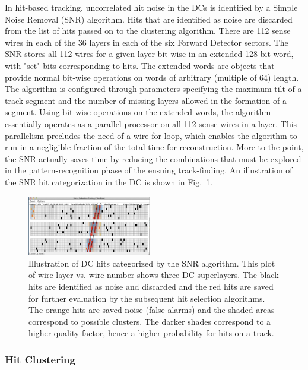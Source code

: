 In hit-based tracking, uncorrelated hit noise in the DCs is identified by a Simple Noise Removal (SNR) algorithm. Hits
that are identified as noise are discarded from the list of hits passed on to the clustering algorithm. There are 112
sense wires in each of the 36 layers in each of the six Forward Detector sectors. The SNR stores all 112 wires for a
given layer bit-wise in an extended 128-bit word, with "set" bits corresponding to hits. The extended words are
objects that provide normal bit-wise operations on words of arbitrary (multiple of 64) length. The algorithm is
configured through parameters specifying the maximum tilt of a track segment and the number of missing layers
allowed in the formation of a segment. Using bit-wise operations on the extended words, the algorithm essentially
operates as a parallel processor on all 112 sense wires in a layer. This parallelism precludes the need of a wire
for-loop, which enables the algorithm to run in a negligible fraction of the total time for reconstruction. More to the
point, the SNR actually saves time by reducing the combinations that must be explored in the pattern-recognition
phase of the ensuing track-finding. An illustration of the SNR hit categorization in the DC is shown in
Fig.~\ref{fig:snr}.

\begin{figure}
\centering
\includegraphics[width=0.48\textwidth]{pics/dcPattern9.png}
\caption{Illustration of DC hits categorized by the SNR algorithm. This plot of wire layer vs. wire number shows three
  DC superlayers. The black hits are identified as noise and discarded and the red hits are saved for further evaluation
  by the subsequent hit selection algorithms. The orange hits are saved noise (false alarms) and the shaded areas
  correspond to possible clusters. The darker shades correspond to a higher quality factor, hence a higher probability
  for hits on a track.}
\label{fig:snr}
\end{figure}

\subsubsection{Hit Clustering}


